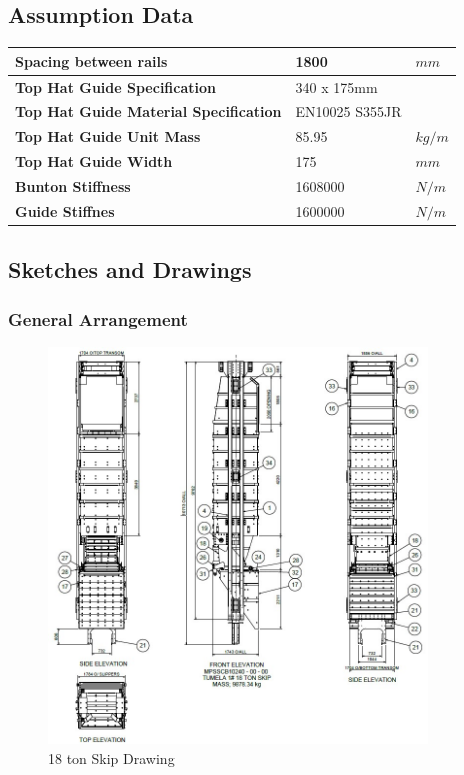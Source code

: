 \documentclass{article}%
\begin{document}
\subsection{Assumption Data}%
\label{subsec:AssumptionData}%
\begin{flushleft}%
\begin{minipage}{\textwidth}%
\flushleft%
\begin{tabular}{|l |l |l|}%
\hline%
\textbf{Spacing between rails}&1800&$mm$\\%
\hline%
\textbf{Top Hat Guide Specification}&340 x 175mm&\\%
\hline%
\textbf{Top Hat Guide Material Specification}&EN10025 S355JR&\\%
\hline%
\textbf{Top Hat Guide Unit Mass}&85.95&$kg/m$\\%
\hline%
\textbf{Top Hat Guide Width}&175&$mm$\\%
\hline%
\textbf{Bunton Stiffness}&1608000&$N/m$\\%
\hline%
\textbf{Guide Stiffnes}&1600000&$N/m$\\%
\hline%
\end{tabular}%
\end{minipage}%
\end{flushleft}

%
\newpage%
\subsection{Sketches and Drawings}%
\label{subsec:SketchesandDrawings}%
\subsubsection{General Arrangement}%
\label{ssubsec:GeneralArrangement}%


\begin{figure}[h!]%
\includegraphics[width=380px]{Tumela 18 ton Skip.jpg}%
\centering%
\caption{18 ton Skip Drawing}%
\centering%
\end{figure}
\end{document}
